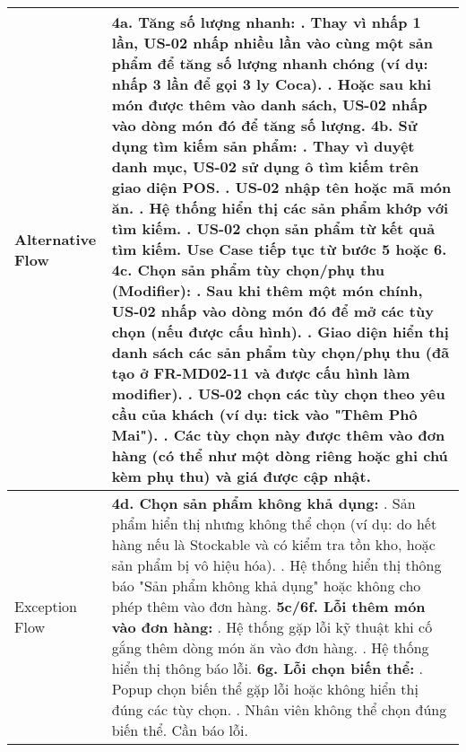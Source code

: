 \begin{longtable}{|m{4cm}|p{11cm}|}
Alternative Flow & \textbf{4a. Tăng số lượng nhanh:} \newline    1. Thay vì nhấp 1 lần, US-02 nhấp nhiều lần vào cùng một sản phẩm để tăng số lượng nhanh chóng (ví dụ: nhấp 3 lần để gọi 3 ly Coca). \newline    2. Hoặc sau khi món được thêm vào danh sách, US-02 nhấp vào dòng món đó để tăng số lượng. \newline \textbf{4b. Sử dụng tìm kiếm sản phẩm:} \newline    1. Thay vì duyệt danh mục, US-02 sử dụng ô tìm kiếm trên giao diện POS. \newline    2. US-02 nhập tên hoặc mã món ăn. \newline    3. Hệ thống hiển thị các sản phẩm khớp với tìm kiếm. \newline    4. US-02 chọn sản phẩm từ kết quả tìm kiếm. Use Case tiếp tục từ bước 5 hoặc 6. \newline \textbf{4c. Chọn sản phẩm tùy chọn/phụ thu (Modifier):} \newline    1. Sau khi thêm một món chính, US-02 nhấp vào dòng món đó để mở các tùy chọn (nếu được cấu hình). \newline    2. Giao diện hiển thị danh sách các sản phẩm tùy chọn/phụ thu (đã tạo ở FR-MD02-11 và được cấu hình làm modifier). \newline    3. US-02 chọn các tùy chọn theo yêu cầu của khách (ví dụ: tick vào "Thêm Phô Mai"). \newline    4. Các tùy chọn này được thêm vào đơn hàng (có thể như một dòng riêng hoặc ghi chú kèm phụ thu) và giá được cập nhật. \\
\hline
Exception Flow & \textbf{4d. Chọn sản phẩm không khả dụng:} \newline    1. Sản phẩm hiển thị nhưng không thể chọn (ví dụ: do hết hàng nếu là Stockable và có kiểm tra tồn kho, hoặc sản phẩm bị vô hiệu hóa). \newline    2. Hệ thống hiển thị thông báo "Sản phẩm không khả dụng" hoặc không cho phép thêm vào đơn hàng. \newline \textbf{5c/6f. Lỗi thêm món vào đơn hàng:} \newline    1. Hệ thống gặp lỗi kỹ thuật khi cố gắng thêm dòng món ăn vào đơn hàng. \newline    2. Hệ thống hiển thị thông báo lỗi. \newline \textbf{6g. Lỗi chọn biến thể:} \newline    1. Popup chọn biến thể gặp lỗi hoặc không hiển thị đúng các tùy chọn. \newline    2. Nhân viên không thể chọn đúng biến thể. Cần báo lỗi. \\

\end{longtable}
